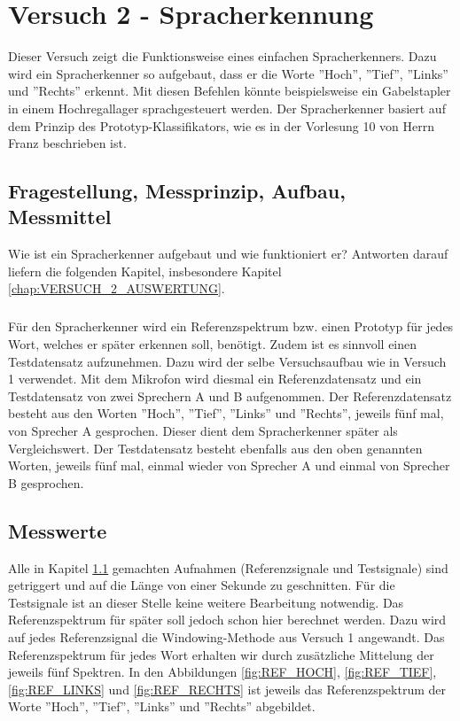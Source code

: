 \documentclass[12pt,oneside,a4paper]{report}
\begin{document}
%
%
\chapter{Versuch 2 - Spracherkennung}
\label{chap:VERSUCH_2}

Dieser Versuch zeigt die Funktionsweise eines einfachen Spracherkenners.
Dazu wird ein Spracherkenner so aufgebaut, dass er die Worte ''Hoch'', ''Tief'', ''Links'' und ''Rechts'' erkennt. Mit diesen Befehlen könnte beispielsweise ein Gabelstapler in einem Hochregallager sprachgesteuert werden. Der Spracherkenner basiert auf dem Prinzip des Prototyp-Klassifikators, wie es in der Vorlesung 10 von Herrn Franz \cite{Franz2015i} beschrieben ist.

\section{Fragestellung, Messprinzip, Aufbau, Messmittel}
\label{chap:VERSUCH_2_FRAGESTELLUNG}

Wie ist ein Spracherkenner aufgebaut und wie funktioniert er?
Antworten darauf liefern die folgenden Kapitel, insbesondere Kapitel \ref{chap:VERSUCH_2_AUSWERTUNG}.

\paragraph{}

Für den Spracherkenner wird ein Referenzspektrum bzw. einen Prototyp für jedes Wort, welches er später erkennen soll, benötigt. Zudem ist es sinnvoll einen Testdatensatz aufzunehmen.
Dazu wird der selbe Versuchsaufbau wie in Versuch 1 verwendet.
Mit dem Mikrofon wird diesmal ein Referenzdatensatz und ein Testdatensatz von zwei Sprechern A und B aufgenommen.
Der Referenzdatensatz besteht aus den Worten ''Hoch'', ''Tief'', ''Links'' und ''Rechts'', jeweils fünf mal, von Sprecher A gesprochen. Dieser dient dem Spracherkenner später als Vergleichswert. Der Testdatensatz besteht ebenfalls aus den oben genannten Worten, jeweils fünf mal, einmal wieder von Sprecher A und einmal von Sprecher B gesprochen.

\section{Messwerte}
\label{chap:VERSUCH_2_MESSWERTE}

Alle in Kapitel \ref{chap:VERSUCH_2_FRAGESTELLUNG} gemachten Aufnahmen (Referenzsignale und Testsignale) sind getriggert und auf die Länge von einer Sekunde zu geschnitten.
Für die Testsignale ist an dieser Stelle keine weitere Bearbeitung notwendig.
Das Referenzspektrum für später soll jedoch schon hier berechnet werden.
Dazu wird auf jedes Referenzsignal die Windowing-Methode aus Versuch 1 angewandt.
Das Referenzspektrum für jedes Wort erhalten wir durch zusätzliche Mittelung der jeweils fünf Spektren.
In den Abbildungen \ref{fig:REF_HOCH}, \ref{fig:REF_TIEF}, \ref{fig:REF_LINKS} und  \ref{fig:REF_RECHTS} ist jeweils das Referenzspektrum der Worte ''Hoch'', ''Tief'', ''Links'' und ''Rechts'' abgebildet.
\end{document}
